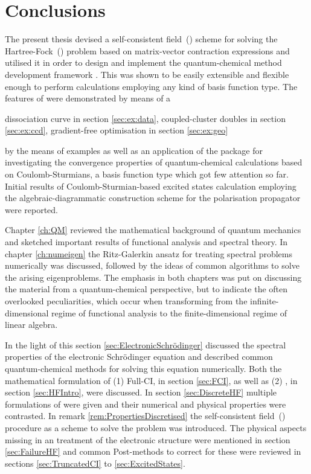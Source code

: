 \chapter{Conclusions}
\label{ch:Conclusion}

\noindent
The present thesis devised a self-consistent field~(\SCF)
scheme for solving the Hartree-Fock~(\HF) problem
based on matrix-vector contraction expressions
and utilised it in order to design and implement the
quantum-chemical method development framework \molsturm.
This was shown to be easily extensible and flexible enough
to perform calculations
employing any kind of basis function type.
The features of \molsturm were demonstrated
by means of a 

 dissociation curve in section \ref{sec:ex:data},
coupled-cluster doubles in section \ref{sec:ex:ccd},
gradient-free optimisation in section \ref{sec:ex:geo}



by the means
of examples as well as an application of the package for
investigating the convergence properties
of quantum-chemical calculations
based on Coulomb-Sturmians,
a basis function type which got few attention so far.
Initial results of Coulomb-Sturmian-based excited states
calculation employing the algebraic-diagrammatic construction scheme
for the polarisation propagator were reported.


Chapter \ref{ch:QM} reviewed the mathematical background of quantum mechanics
and sketched important results of functional analysis
and spectral theory.
In chapter \ref{ch:numeigen} the Ritz-Galerkin ansatz
for treating spectral problems numerically
was discussed, followed by the ideas of common algorithms
to solve the arising eigenproblems.
The emphasis in both chapters
was put on discussing the material from a quantum-chemical perspective,
but to indicate the often overlooked peculiarities,
which occur when transforming from the infinite-dimensional regime
of functional analysis to the finite-dimensional regime of linear algebra.


In the light of this section \ref{sec:ElectronicSchrödinger}
discussed the spectral properties
of the electronic Schrödinger equation and
described common quantum-chemical methods
for solving this equation numerically.
Both the mathematical formulation of (1) Full-CI, in section \ref{sec:FCI},
as well as (2) \HF, in section \ref{sec:HFIntro}, were discussed.
In section \ref{sec:DiscreteHF} multiple formulations of \HF were given
and their numerical and physical properties were contrasted.
In remark \ref{rem:PropertiesDiscretised}
the self-consistent field~(\SCF) procedure
as a scheme to solve the \HF problem was introduced.
The physical aspects missing in an \HF treatment of the electronic
structure were mentioned in section \ref{sec:FailureHF}
and common Post-\HF methods to correct for these were
reviewed in sections \ref{sec:TruncatedCI} to \ref{sec:ExcitedStates}.

